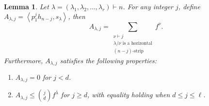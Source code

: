 \documentclass[12pt]{article}
\newtheorem{lemma}{Lemma}[section]
\theoremstyle{definition}
\newcommand{\1}{\mathbf 1}
\begin{document}
\begin{lemma}\label{lem:A_lambda_j bound}
Let $\lambda = (\lambda_1, \lambda_2, \ldots, \lambda_r)\vdash n$. For any integer $j$, define $A_{\lambda,j} = \left\langle p_1^j h_{n-j}, s_\lambda \right\rangle$, then
$$A_{\lambda,j} = \sum_{\substack{\nu \vdash j \\ \lambda/\nu \text{ is a horizontal} \\ (n-j)\text{-strip}}} f^\nu.
$$
Furthermore, $A_{\lambda, j}$ satisfies the following properties:
\begin{enumerate}
    \item $A_{\lambda,j} = 0$ for $j < d$.
    \item $A_{\lambda,j} \leq \binom{j}{d} f^{\overline{\lambda}}$ for $j \geq d$, with equality holding when $d \leq j \leq \ell$.
\end{enumerate}
\end{lemma}
\end{document}
